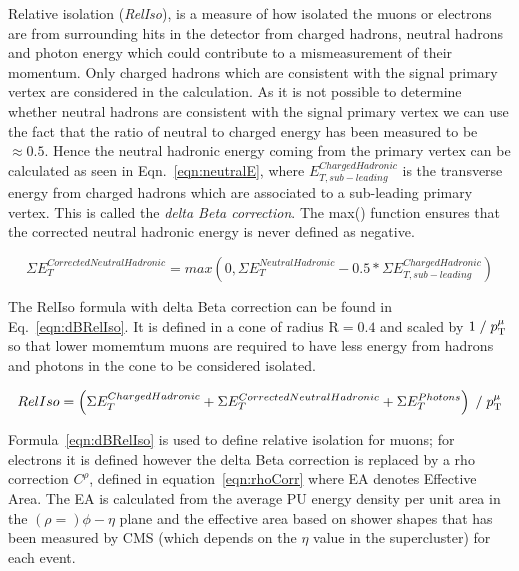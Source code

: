 Relative isolation (\emph{RelIso}), is a measure of how isolated the muons or electrons are from surrounding hits in the detector from charged hadrons, neutral hadrons and photon energy which could contribute to a mismeasurement of their momentum. Only charged hadrons which are consistent with the signal primary vertex are considered in the calculation. As it is not possible to determine whether neutral hadrons are consistent with the signal primary vertex we can use the fact that the ratio of neutral to charged energy has been measured to be $\approx 0.5$. Hence the neutral hadronic energy coming from the primary vertex can be calculated as seen in Eqn.~\ref{eqn:neutralE}, where $E_{T,sub-leading}^{Charged Hadronic}$ is the transverse energy from charged hadrons which are associated to a sub-leading primary vertex. This is called the \emph{delta Beta correction}. The max() function ensures that the corrected neutral hadronic energy is never defined as negative.


\begin{centering}
\begin{equation}
\Sigma E_{T}^{Corrected Neutral Hadronic}  =  max(0, \Sigma E_{T}^{Neutral Hadronic} - 0.5*\Sigma E_{T,sub-leading}^{Charged Hadronic} )
\label{eqn:neutralE}
\end{equation}
\end{centering}



The RelIso formula with delta Beta correction can be found in Eq.~\ref{eqn:dBRelIso}. It is defined in a cone of radius $\textrm{R}=0.4$ and scaled by $1\; / \;p_{\mathrm{T}}^{\mu}$ so that lower momemtum muons are required to have less energy from hadrons and photons in the cone to be considered isolated.

\begin{centering}
\begin{equation}
RelIso = \left( \Sigma E_{T}^{Charged Hadronic} + \Sigma E_{T}^{Corrected Neutral Hadronic} +  \Sigma E_{T}^{Photons} \right) \; / \;   p_{\mathrm{T}}^{\mu}
\label{eqn:dBRelIso}
\end{equation}
\end{centering}


Formula~\ref{eqn:dBRelIso} is used to define relative isolation for muons; for electrons it is defined however the delta Beta correction is replaced by a rho correction $C^{\rho}$, defined in equation~\ref{eqn:rhoCorr} where EA denotes Effective Area. The EA is calculated from the average PU energy density per unit area in the $(\rho=)\phi-\eta$ plane and the effective area based on shower shapes that has been measured by CMS (which depends on the $\eta$ value in the supercluster) for each event.


